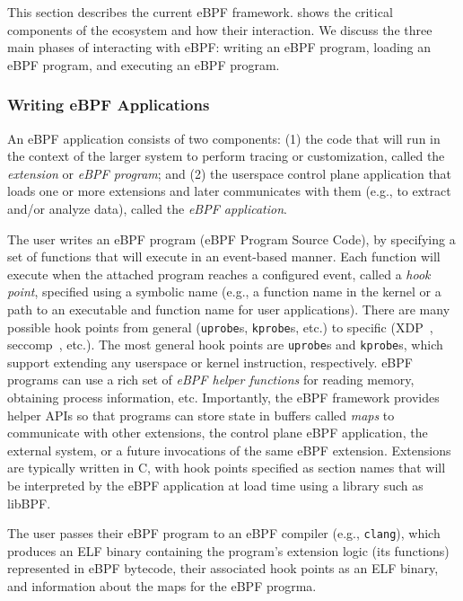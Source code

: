 This section describes the current eBPF framework.  shows the  critical components of the ecosystem and how their interaction.  We discuss the three main phases of interacting with eBPF: writing an eBPF program, loading an eBPF program, and executing an eBPF program.


\subsubsection{Writing eBPF Applications}

An eBPF application consists of two components: (1) the code that will run in the context of the larger system to perform tracing or customization, called the {\em extension} or {\em eBPF program}; and (2) the userspace control plane application that loads one or more extensions and later communicates with them (e.g., to extract and/or analyze data), called the {\em eBPF application}.  

The user writes an eBPF program (eBPF Program Source Code), by specifying a set of functions that will execute in an event-based manner.  Each function will execute when the attached program reaches a configured event, called a \emph{hook point}, specified using a symbolic name (e.g., a function name in the kernel or a path to an executable and function name for user applications).  There are many possible hook points from general (\texttt{uprobe}s, \texttt{kprobe}s, etc.) to specific (XDP~\cite{vieira2020fast}, seccomp~\cite{seccomp-ebpf}, etc.).  The most general hook points are \texttt{uprobe}s and \texttt{kprobe}s, which support extending any userspace or kernel instruction, respectively.  eBPF programs can use a rich set of {\em eBPF helper functions} for reading memory, obtaining process information, etc.  Importantly, the eBPF framework provides helper APIs so that programs can store state in buffers called {\em maps} to communicate with other extensions, the control plane eBPF application, the external system, or a future invocations of the same eBPF extension.  Extensions are typically written in C, with hook points specified as section names that will be interpreted by the eBPF application at load time using a library such as libBPF.

The user passes their eBPF program to an eBPF compiler (e.g., \texttt{clang}), which produces an ELF binary containing the program's extension logic (\ie its functions) represented in eBPF bytecode, their associated hook points as an ELF binary, and information about the maps for the eBPF progrma. 

